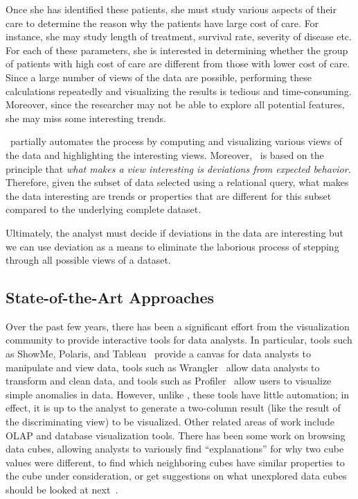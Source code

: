 Once she has identified these patients, she must study various aspects of their
care to determine the reason why the patients have large cost of care. For
instance, she may study length of treatment, survival rate, severity of disease
etc. For each of these parameters, she is interested in determining whether the
group of patients with high cost of care are different from those with lower
cost of care. Since a large number of views of the data are possible, performing
these calculations repeatedly and visualizing the results is tedious and
time-consuming. Moreover, since the researcher may not be able to explore all
potential features, she may miss some interesting trends.

\SeeDB\ partially automates the process by computing and visualizing various
views of the data and highlighting the interesting views. Moreover, \SeeDB\ is
based on the principle that {\it what makes a view interesting is deviations
from expected behavior}. Therefore, given the subset of data selected using a
relational query, what makes the data interesting are trends or properties that
are different for this subset compared to the underlying complete dataset.

Ultimately, the analyst must decide if deviations in the data are interesting
but we can use deviation as a means to eliminate the laborious process
of stepping through all possible views of a dataset. 

\subsection{State-of-the-Art Approaches}
\label{related_work}

Over the past few years, there has been a significant
effort from the visualization community to provide interactive tools
for data analysts. In particular, tools such as ShowMe, Polaris, and
Tableau~\cite{DBLP:journals/cacm/StolteTH08,
  DBLP:journals/tvcg/MackinlayHS07} provide a canvas for data analysts
to manipulate and view data, tools such as
Wrangler~\cite{DBLP:conf/chi/KandelPHH11} allow data analysts to
transform and clean data, and tools such as
Profiler~\cite{DBLP:conf/avi/KandelPPHH12} allow users to visualize
simple anomalies in data.  However, unlike \SeeDB, these tools have
little automation; in effect, it is up to the analyst to generate a
two-column result (like the result of the discriminating view)
to be visualized. Other related areas of work include OLAP and database
visualization tools. There has been some work on browsing data cubes, allowing
analysts to variously find ``explanations'' for why two cube values were
different, to find which neighboring cubes have similar properties to the cube
under consideration, or get suggestions on what unexplored data cubes should be
looked at next~\cite{DBLP:conf/vldb/Sarawagi99, DBLP:conf/vldb/SatheS01,
DBLP:conf/vldb/Sarawagi00}.

